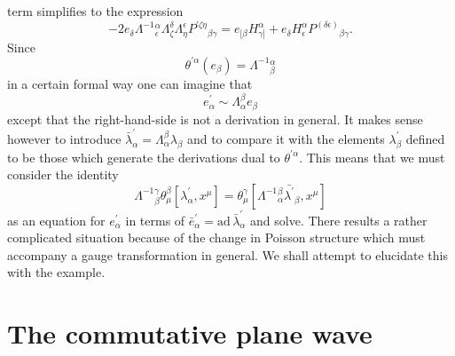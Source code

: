 \documentclass[12pt,a4paper]{article}
\newcounter{eg}
\def\ad{\mbox{ad}\,}
\newcommand{\initiate}{\setcounter{equation}{0}}
\begin{document}
term simplifies to the expression
\begin{equation}
- 2e_\delta\Lambda^{-1}{}^\alpha_\epsilon \Lambda^\delta_\zeta
\Lambda^\epsilon_\eta P^{\prime\zeta\eta}{}_{\beta\gamma} = e_{[\beta}
H^\alpha_{\gamma]} + e_\delta
H^\alpha_\epsilon P^{(\delta\epsilon)}{}_{\beta\gamma}.
                                                                \label{SW1}
\end{equation}        
Since
$$
\theta^{\prime\alpha}(e_\beta) = \Lambda^{-1}{}^\alpha_\beta
$$
in a certain formal way one can imagine that
$$
e^\prime_\alpha \sim \Lambda^\beta_\alpha e_\beta
$$
except that the right-hand-side is not a derivation in general. It
makes sense however to introduce 
$\bar{\lambda}^\prime_\alpha = \Lambda_\alpha^\beta \lambda_\beta$ 
and to compare it with the elements $\lambda^\prime_\beta$ defined to
be those which generate the derivations dual to
$\theta^{\prime\alpha}$.  This means that we must consider the
identity
$$
\Lambda^{-1}{}^\gamma_\beta \theta^\beta_\mu
[\lambda^\prime_\alpha, x^\mu] = \theta^\gamma_\mu
[\Lambda^{-1}{}^\beta_\alpha \bar{\lambda^\prime}_\beta, x^\mu]
$$
as an equation for $e^\prime_\alpha$ in terms of 
$\bar {e}^\prime_\alpha = \ad \bar{\lambda}^\prime_\alpha$ and solve. There
results a rather complicated situation because of the change in
Poisson structure which must accompany a gauge transformation in
general. We shall attempt to elucidate this with the example.


\initiate
\section{The commutative plane wave}\label{spp}
\end{document}
